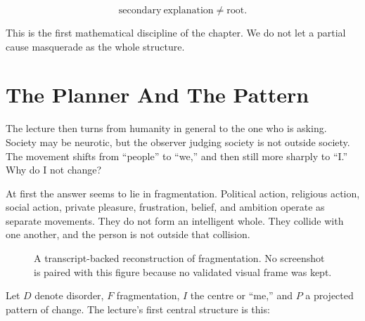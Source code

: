 \begin{equation}
\mathrm{secondary\ explanation}
\neq
\mathrm{root}.
\end{equation}

This is the first mathematical discipline of the chapter. We do not let a partial cause masquerade as the whole structure.

\section{The Planner And The Pattern}

The lecture then turns from humanity in general to the one who is asking. Society may be neurotic, but the observer judging society is not outside society. The movement shifts from ``people'' to ``we,'' and then still more sharply to ``I.'' Why do I not change?

At first the answer seems to lie in fragmentation. Political action, religious action, social action, private pleasure, frustration, belief, and ambition operate as separate movements. They do not form an intelligent whole. They collide with one another, and the person is not outside that collision.

\begin{figure}
\centering
{}
\caption{A transcript-backed reconstruction of fragmentation. No screenshot is paired with this figure because no validated visual frame was kept.}
\end{figure}

Let \(D\) denote disorder, \(F\) fragmentation, \(I\) the centre or ``me,'' and \(P\) a projected pattern of change. The lecture's first central structure is this:

